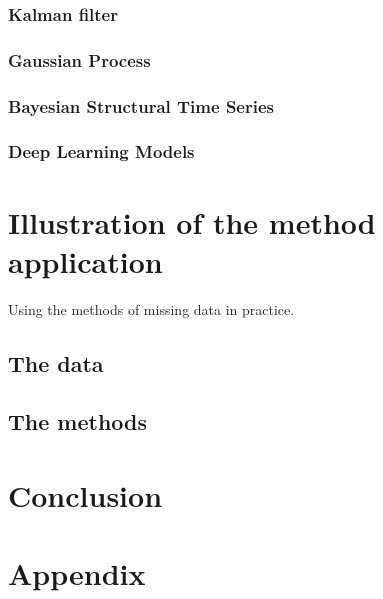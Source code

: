 \documentclass[
]{report}
\begin{document}
\subsection{Kalman filter}\label{kalman-filter}

\subsection{Gaussian Process}\label{gaussian-process}

\subsection{Bayesian Structural Time
Series}\label{bayesian-structural-time-series}

\subsection{Deep Learning Models}\label{deep-learning-models}

\chapter{Illustration of the method
application}\label{illustration-of-the-method-application}

Using the methods of missing data in practice.

\section{The data}\label{the-data}

\section{The methods}\label{the-methods}

\chapter{Conclusion}\label{conclusion}

\chapter{Appendix}\label{appendix}
\end{document}
